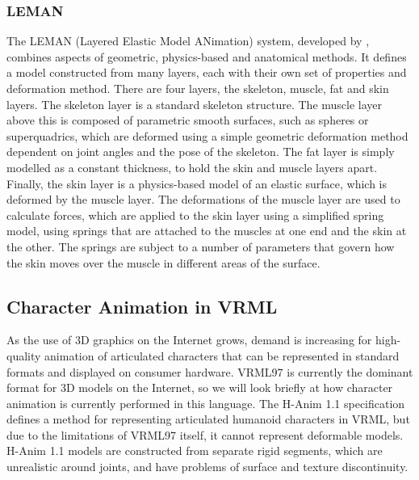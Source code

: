 \subsubsection{\label{sec:litreview:animation:physics:leman}LEMAN}
The LEMAN (Layered Elastic Model ANimation) system, developed by \citet{Turner93}, combines aspects of geometric, physics-based and anatomical methods. It defines a model constructed from many layers, each with their own set of properties and deformation method. There are four layers, the skeleton, muscle, fat and skin layers. The skeleton layer is a standard skeleton structure. The muscle layer above this is composed of parametric smooth surfaces, such as spheres or superquadrics, which are deformed using a simple geometric deformation method dependent on joint angles and the pose of the skeleton. The fat layer is simply modelled as a constant thickness, to hold the skin and muscle layers apart. Finally, the skin layer is a physics-based model of an elastic surface, which is deformed by the muscle layer. The deformations of the muscle layer are used to calculate forces, which are applied to the skin layer using a simplified spring model, using springs that are attached to the muscles at one end and the skin at the other. The springs are subject to a number of parameters that govern how the skin moves over the muscle in different areas of the surface.

\subsection{\label{sec:litreview:animation:vrml}Character Animation in VRML}
As the use of 3D graphics on the Internet grows, demand is increasing for high-quality animation of articulated characters that can be represented in standard formats and displayed on consumer hardware. VRML97 \cite{VRML97} is currently the dominant format for 3D models on the Internet, so we will look briefly at how character animation is currently performed in this language. The H-Anim 1.1 specification \cite{HANIM99} defines a method for representing articulated humanoid characters in VRML, but due to the limitations of VRML97 itself, it cannot represent deformable models. H-Anim 1.1 models are constructed from separate rigid segments, which are unrealistic around joints, and have problems of surface and texture discontinuity.

